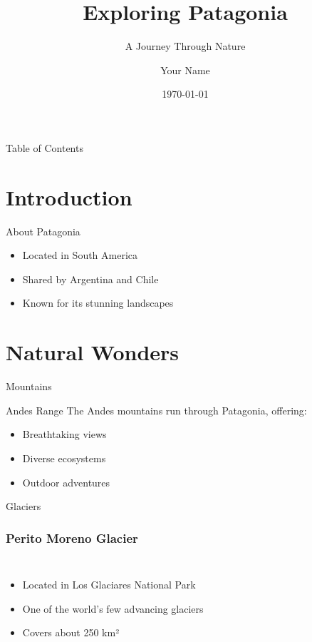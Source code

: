 \documentclass[aspectratio=169]{beamer}
\title{Exploring Patagonia}
\subtitle{A Journey Through Nature}
\author{Your Name}
\date{\today}
\begin{document}
\begin{frame}
    \titlepage
\end{frame}

\begin{frame}{Table of Contents}
    \tableofcontents
\end{frame}

\section{Introduction}

\begin{frame}{About Patagonia}
    \begin{itemize}
        \item Located in South America
        \item Shared by Argentina and Chile
        \item Known for its stunning landscapes
    \end{itemize}
\end{frame}

\section{Natural Wonders}

\begin{frame}{Mountains}
    \begin{block}{Andes Range}
        The Andes mountains run through Patagonia, offering:
        \begin{itemize}
            \item Breathtaking views
            \item Diverse ecosystems
            \item Outdoor adventures
        \end{itemize}
    \end{block}
\end{frame}

\begin{frame}{Glaciers}
    \frametitle{Perito Moreno Glacier}
    \begin{columns}[c]
        \begin{itemize}
            \item Located in Los Glaciares National Park
            \item One of the world's few advancing glaciers
            \item Covers about 250 km²
        \end{itemize}
        
    \end{columns}
\end{frame}
\end{document}

